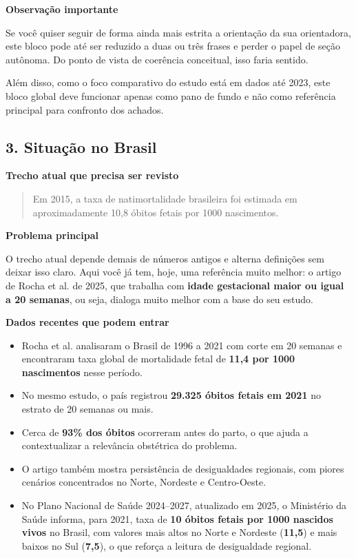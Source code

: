 \documentclass[12pt,a4paper]{article}
\begin{document}
\textbf{Observação importante}

Se você quiser seguir de forma ainda mais estrita a orientação da sua orientadora, este bloco pode até ser reduzido a duas ou três frases e perder o papel de seção autônoma. Do ponto de vista de coerência conceitual, isso faria sentido.

Além disso, como o foco comparativo do estudo está em dados até 2023, este bloco global deve funcionar apenas como pano de fundo e não como referência principal para confronto dos achados.

\subsection*{3. Situação no Brasil}

\textbf{Trecho atual que precisa ser revisto}

\begin{quote}
Em 2015, a taxa de natimortalidade brasileira foi estimada em aproximadamente 10,8 óbitos fetais por 1000 nascimentos.
\end{quote}

\textbf{Problema principal}

O trecho atual depende demais de números antigos e alterna definições sem deixar isso claro. Aqui você já tem, hoje, uma referência muito melhor: o artigo de Rocha et al. de 2025, que trabalha com \textbf{idade gestacional maior ou igual a 20 semanas}, ou seja, dialoga muito melhor com a base do seu estudo.

\textbf{Dados recentes que podem entrar}

\begin{itemize}
\item Rocha et al. analisaram o Brasil de 1996 a 2021 com corte em 20 semanas e encontraram taxa global de mortalidade fetal de \textbf{11,4 por 1000 nascimentos} nesse período.
\item No mesmo estudo, o país registrou \textbf{29.325 óbitos fetais em 2021} no estrato de 20 semanas ou mais.
\item Cerca de \textbf{93\% dos óbitos} ocorreram antes do parto, o que ajuda a contextualizar a relevância obstétrica do problema.
\item O artigo também mostra persistência de desigualdades regionais, com piores cenários concentrados no Norte, Nordeste e Centro-Oeste.
\item No Plano Nacional de Saúde 2024--2027, atualizado em 2025, o Ministério da Saúde informa, para 2021, taxa de \textbf{10 óbitos fetais por 1000 nascidos vivos} no Brasil, com valores mais altos no Norte e Nordeste (\textbf{11,5}) e mais baixos no Sul (\textbf{7,5}), o que reforça a leitura de desigualdade regional.
\end{itemize}
\end{document}
